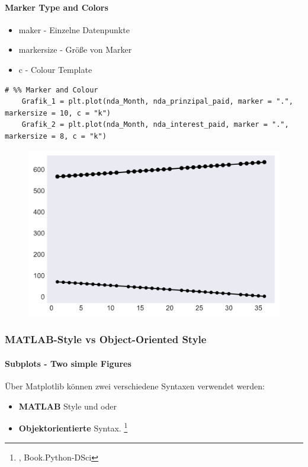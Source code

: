 \paragraph{Marker Type and Colors}
\begin{itemize}
	\item maker - Einzelne Datenpunkte
	\item markersize - Größe von Marker
	\item c - Colour Template
\end{itemize}
\begin{lstlisting}[style=Python]
	# %% Marker and Colour
	Grafik_1 = plt.plot(nda_Month, nda_prinzipal_paid, marker = ".", markersize = 10, c = "k")
	Grafik_2 = plt.plot(nda_Month, nda_interest_paid, marker = ".", markersize = 8, c = "k")
\end{lstlisting}
\begin{figure}[H]
	\centering
	\includegraphics[scale = 0.8]{attachment/chapter_4/Scc018}
\end{figure}




\subsubsection{MATLAB-Style vs Object-Oriented Style}
\paragraph{Subplots - Two simple Figures}
Über Matplotlib können zwei verschiedene Syntaxen verwendet werden:
\begin{itemize}
	\item \textbf{MATLAB} Style und oder
	\item \textbf{Objektorientierte} Syntax. \footnote{\cite{URL.Python-Tutorial}, \cite{}Book.Python-DSci}
\end{itemize}

